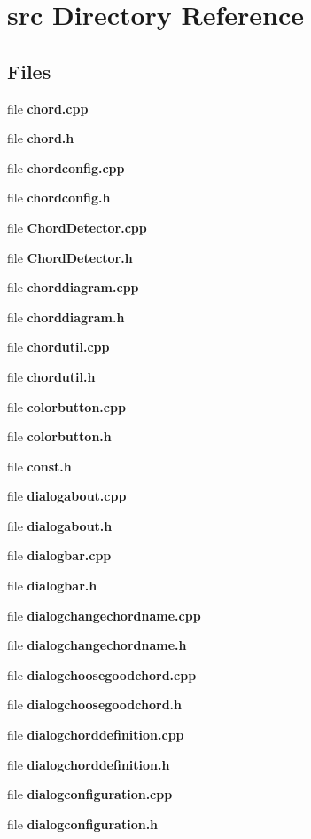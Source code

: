\section{src Directory Reference}
\label{dir_68267d1309a1af8e8297ef4c3efbcdba}
\subsection*{Files}
\begin{DoxyCompactItemize}
\item 
file \textbf{ chord.\+cpp}
\item 
file \textbf{ chord.\+h}
\item 
file \textbf{ chordconfig.\+cpp}
\item 
file \textbf{ chordconfig.\+h}
\item 
file \textbf{ Chord\+Detector.\+cpp}
\item 
file \textbf{ Chord\+Detector.\+h}
\item 
file \textbf{ chorddiagram.\+cpp}
\item 
file \textbf{ chorddiagram.\+h}
\item 
file \textbf{ chordutil.\+cpp}
\item 
file \textbf{ chordutil.\+h}
\item 
file \textbf{ colorbutton.\+cpp}
\item 
file \textbf{ colorbutton.\+h}
\item 
file \textbf{ const.\+h}
\item 
file \textbf{ dialogabout.\+cpp}
\item 
file \textbf{ dialogabout.\+h}
\item 
file \textbf{ dialogbar.\+cpp}
\item 
file \textbf{ dialogbar.\+h}
\item 
file \textbf{ dialogchangechordname.\+cpp}
\item 
file \textbf{ dialogchangechordname.\+h}
\item 
file \textbf{ dialogchoosegoodchord.\+cpp}
\item 
file \textbf{ dialogchoosegoodchord.\+h}
\item 
file \textbf{ dialogchorddefinition.\+cpp}
\item 
file \textbf{ dialogchorddefinition.\+h}
\item 
file \textbf{ dialogconfiguration.\+cpp}
\item 
file \textbf{ dialogconfiguration.\+h}
\item 

\end{DoxyCompactItemize}
